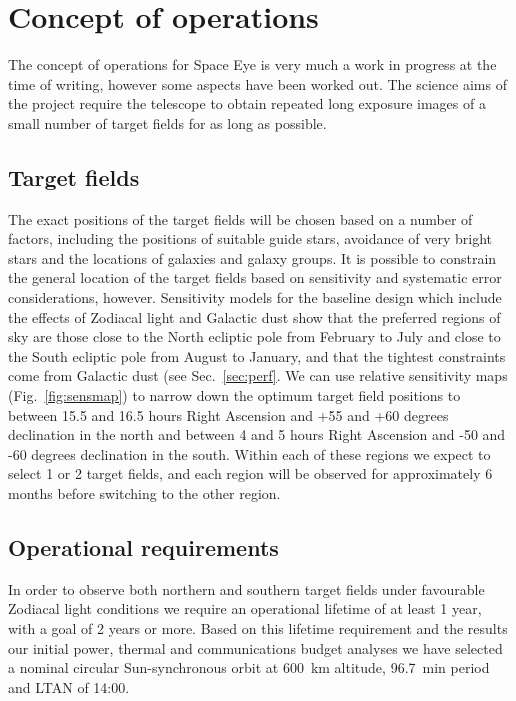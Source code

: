 \documentclass[]{iac}
\begin{document}
\section{Concept of operations}
\label{sec:conops}

The concept of operations for Space Eye is very much a work in progress at the time of writing, however some aspects
have been worked out. The science aims of the project require the telescope to obtain repeated long exposure images of a
small number of target fields for as long as possible.

\subsection{Target fields}

The exact positions of the target fields will be chosen based on a number of factors, including the positions of
suitable guide stars, avoidance of very bright stars and the locations of galaxies and galaxy groups. It is possible to
constrain the general location of the target fields based on sensitivity and systematic error considerations, however.
Sensitivity models for the baseline design which include the effects of Zodiacal light and Galactic dust show that the
preferred regions of sky are those close to the North ecliptic pole from February to July and close to the South
ecliptic pole from August to January, and that the tightest constraints come from Galactic dust (see
Sec.~\ref{sec:perf}. We can use relative sensitivity maps (Fig.~\ref{fig:sensmap}) to narrow down the optimum target
field positions to between 15.5 and 16.5 hours Right Ascension and +55 and +60 degrees declination in the north and
between 4 and 5 hours Right Ascension and -50 and -60 degrees declination in the south. Within each of these regions we
expect to select 1 or 2 target fields, and each region will be observed for approximately 6 months before switching to
the other region.

\subsection{Operational requirements}

In order to observe both northern and southern target fields under favourable Zodiacal light conditions we require an
operational lifetime of at least 1 year, with a goal of 2 years or more. Based on this lifetime requirement and the
results our initial power, thermal and communications budget analyses we have selected a nominal circular
Sun-synchronous orbit at \SI{600}{\kilo\metre} altitude, \SI{96.7}{\minute} period and LTAN of 14:00.
\end{document}
